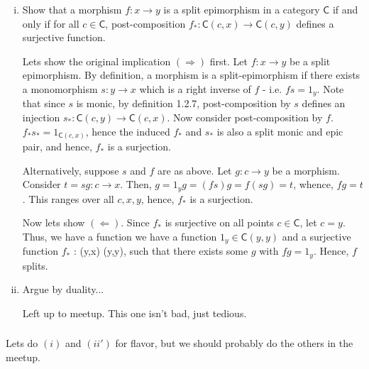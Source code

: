 \documentclass[10pt, oneside]{article}   	%
\newcommand{\cat}[1]{\bm{ \mathsf{#1} }}
\newcommand{\cc}{\cat{C}}
\begin{document}
\subsubsection{}
\begin{enumerate}[(i)]

\item Show that a morphism $f: x \to y$ is a split epimorphism in a category $\cc$ if and only if for all $c \in \cc$, post-composition $f_*: \cc(c,x) \to \cc(c,y)$ defines a surjective function. 

Lets show the original implication $(\Rightarrow)$ first. Let $f : x \to y$ be a split epimorphism. By definition, a morphism is a split-epimorphism if there exists a monomorphism $s : y \to x$ which is a right inverse of $f$ - i.e. $fs = 1_y$.  Note that since $s$ is monic, by definition 1.2.7, post-composition by $s$ defines an injection $s_* : \cc(c,y) \to \cc(c, x)$. Now consider post-composition by $f$. $f_*s_* = 1_{\cc(c,x)}$, hence the induced $f_*$ and $s_*$ is also a split monic and epic pair, and hence, $f_*$ is a surjection. 

Alternatively, suppose $s$ and $f$ are as above. Let $g : c \to y$ be a morphism. Consider $t = sg : c \to x$. Then, $g = 1_yg = (fs)g = f(sg) = t$, whence, $fg = t$. This ranges over all $c, x, y$, hence, $f_*$ is a surjection. 

Now lets show $(\Leftarrow)$. Since $f_*$ is surjective on all points $c \in \cc$,  let $c = y$. Thus, we have a function we have a function $1_y \in \cc(y,y)$ and a surjective function $f_*$ : \cc(y,x) \to \cc(y,y), such that there exists some $g$ with $fg = 1_y$. Hence, $f$ splits. 

\item Argue by duality... 

Left up to meetup. This one isn't bad, just tedious.

\end{enumerate}

\subsubsection{}

Lets do $(i)$ and $(ii')$ for flavor, but we should probably do the others in the meetup.
\end{document}
